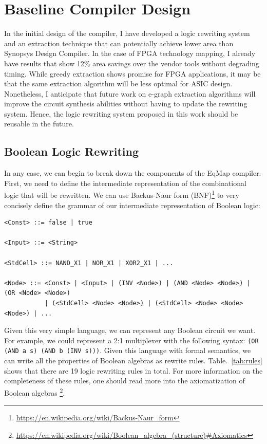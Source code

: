 \documentclass[10pt,letterpaper]{article}
\newcommand{\shortname}{EqMap}
\begin{document}
\section{Baseline Compiler Design}\label{sec:baseline}

In the initial design of the compiler, I have developed a logic rewriting
system and an extraction technique that can potentially achieve lower area than
Synopsys Design Compiler. In the case of FPGA technology mapping, I already
have results that show 12\% area savings over the vendor tools without
degrading timing. While greedy extraction shows promise for FPGA applications,
it may be that the same extraction algorithm will be less optimal for ASIC
design. Nonetheless, I anticipate that future work on e-graph extraction
algorithms will improve the circuit synthesis abilities without having to
update the rewriting system. Hence, the logic rewriting system proposed in this
work should be reusable in the future.

\subsection{Boolean Logic Rewriting}\label{sec:baseline:rewriting}
In any case, we can begin to break down the components of the \shortname{}
compiler. First, we need to define the intermediate representation of the
combinational logic that will be rewritten. We can use Backus-Naur form
(BNF)\footnote{\href{https://en.wikipedia.org/wiki/Backus\%E2\%80\%93Naur\_form}{https://en.wikipedia.org/wiki/Backus-Naur\_form}}
to very concisely define the grammar of our intermediate representation of
Boolean logic:

\begin{verbatim}
<Const> ::= false | true

<Input> ::= <String>

<StdCell> ::= NAND_X1 | NOR_X1 | XOR2_X1 | ...

<Node> ::= <Const> | <Input> | (INV <Node>) | (AND <Node> <Node>) | (OR <Node> <Node>)
           | (<StdCell> <Node> <Node>) | (<StdCell> <Node> <Node> <Node>) | ...
\end{verbatim}

Given this very simple language, we can represent any Boolean circuit we want.
For example, we could represent a 2:1 multiplexer with the following syntax:
\texttt{(OR (AND a s) (AND b (INV s)))}. Given this language with formal
semantics, we can write all the properties of Boolean algebras as rewrite
rules. Table.~\ref{tab:rules} shows that there are 19 logic rewriting rules in
total. For more information on the completeness of these rules, one should read
more into the axiomatization of Boolean algebras
\footnote{\href{https://en.wikipedia.org/wiki/Boolean\_algebra\_(structure)\#Axiomatics}{https://en.wikipedia.org/wiki/Boolean\_algebra\_(structure)\#Axiomatics}}.
\end{document}
